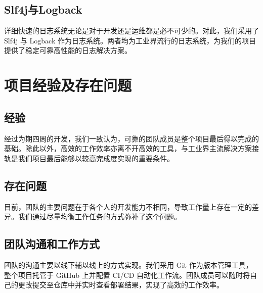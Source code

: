 \documentclass{article}
\begin{document}
\subsection{Slf4j与Logback}

详细快速的日志系统无论是对于开发还是运维都是必不可少的。对此，我们采用了 Slf4j 与 Logback 作为日志系统。两者均为工业界流行的日志系统，为我们的项目提供了稳定可靠高性能的日志解决方案。

\section{项目经验及存在问题}

\subsection{经验}

经过为期四周的开发，我们一致认为，可靠的团队成员是整个项目最后得以完成的基础。除此以外，高效的工作效率亦离不开高效的工具，与工业界主流解决方案接轨是我们项目最后能够以较高完成度实现的重要条件。

\subsection{存在问题}

目前，团队的主要问题在于各个人的开发能力不相同，导致工作量上存在一定的差异。我们通过尽量均衡工作任务的方式弥补了这个问题。

\subsection{团队沟通和工作方式}

团队的沟通主要以线下辅以线上的方式实现。我们采用 Git 作为版本管理工具，整个项目托管于 GitHub 上并配置 CI/CD 自动化工作流。团队成员可以随时将自己的更改提交至仓库中并实时查看部署结果，实现了高效的工作效率。
\end{document}
